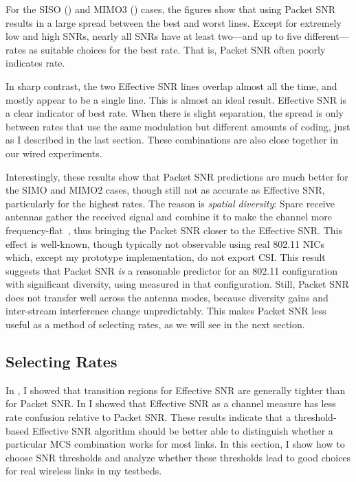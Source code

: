 For the SISO () and MIMO3 () cases, the figures show that using Packet SNR results in a large spread between the best and worst lines. Except for extremely low and high SNRs, nearly all SNRs have at least two---and up to five different---rates as suitable choices for the best rate. That is, Packet SNR often poorly indicates rate.

In sharp contrast, %
the two Effective SNR lines overlap almost all the time, and mostly appear to be a single line. This is almost an ideal result. Effective SNR is a clear indicator of best rate. When there is slight separation, the spread is only between rates that use the same modulation but different amounts of coding, just as I described in the last section. These combinations are also close together in our wired experiments. 

Interestingly, these results show that Packet SNR predictions are much better for the SIMO and MIMO2 cases, though still not as accurate as Effective SNR, particularly for the highest rates. The reason is \emph{spatial diversity}: Spare receive antennas gather the received signal and combine it to make the channel more frequency-flat~\cite{Halperin_dummies}, thus bringing the Packet SNR closer to the Effective SNR. This effect is well-known, though typically not observable using real 802.11 NICs which, except my prototype implementation, do not export CSI. This result suggests that Packet SNR \emph{is} a reasonable predictor for an 802.11 configuration with significant diversity, using measured in that configuration. Still, Packet SNR does not transfer well across the antenna modes, because diversity gains and inter-stream interference change unpredictably. This makes Packet SNR less useful as a method of selecting rates, as we will see in the next section.


\subsection{Selecting Rates}
In , I showed that transition regions for Effective SNR are generally tighter than for Packet SNR. In  I showed that Effective SNR as a channel measure has less rate confusion relative to Packet SNR. These results indicate that a threshold-based Effective SNR algorithm should be better able to distinguish whether a particular MCS combination works for most links. In this section, I show how to choose SNR thresholds and analyze whether these thresholds lead to good choices for real wireless links in my testbeds.

